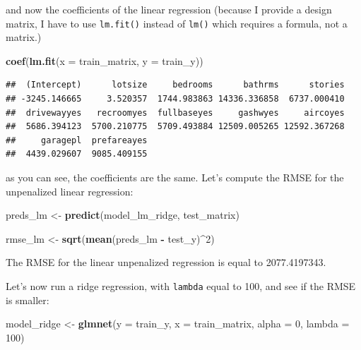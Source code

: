 \documentclass[]{gitbook}
\newenvironment{Shaded}{\begin{snugshade}}{\end{snugshade}}
\newcommand{\DataTypeTok}[1]{\textcolor[rgb]{0.13,0.29,0.53}{#1}}
\newcommand{\DecValTok}[1]{\textcolor[rgb]{0.00,0.00,0.81}{#1}}
\newcommand{\KeywordTok}[1]{\textcolor[rgb]{0.13,0.29,0.53}{\textbf{#1}}}
\newcommand{\NormalTok}[1]{#1}
\newcommand{\OperatorTok}[1]{\textcolor[rgb]{0.81,0.36,0.00}{\textbf{#1}}}
\newcommand{\StringTok}[1]{\textcolor[rgb]{0.31,0.60,0.02}{#1}}
\begin{document}
and now the coefficients of the linear regression (because I provide a design matrix, I have to use
\texttt{lm.fit()} instead of \texttt{lm()} which requires a formula, not a matrix.)

\begin{Shaded}
\begin{Highlighting}[]
\KeywordTok{coef}\NormalTok{(}\KeywordTok{lm.fit}\NormalTok{(}\DataTypeTok{x =}\NormalTok{ train_matrix, }\DataTypeTok{y =}\NormalTok{ train_y))}
\end{Highlighting}
\end{Shaded}

\begin{verbatim}
##  (Intercept)      lotsize     bedrooms      bathrms      stories 
## -3245.146665     3.520357  1744.983863 14336.336858  6737.000410 
##  drivewayyes   recroomyes  fullbaseyes     gashwyes     aircoyes 
##  5686.394123  5700.210775  5709.493884 12509.005265 12592.367268 
##     garagepl  prefareayes 
##  4439.029607  9085.409155
\end{verbatim}

as you can see, the coefficients are the same. Let's compute the RMSE for the unpenalized linear
regression:

\begin{Shaded}
\begin{Highlighting}[]
\NormalTok{preds_lm <-}\StringTok{ }\KeywordTok{predict}\NormalTok{(model_lm_ridge, test_matrix)}

\NormalTok{rmse_lm <-}\StringTok{ }\KeywordTok{sqrt}\NormalTok{(}\KeywordTok{mean}\NormalTok{(preds_lm }\OperatorTok{-}\StringTok{ }\NormalTok{test_y)}\OperatorTok{^}\DecValTok{2}\NormalTok{)}
\end{Highlighting}
\end{Shaded}

The RMSE for the linear unpenalized regression is equal to 2077.4197343.

Let's now run a ridge regression, with \texttt{lambda} equal to 100, and see if the RMSE is smaller:

\begin{Shaded}
\begin{Highlighting}[]
\NormalTok{model_ridge <-}\StringTok{ }\KeywordTok{glmnet}\NormalTok{(}\DataTypeTok{y =}\NormalTok{ train_y, }\DataTypeTok{x =}\NormalTok{ train_matrix, }\DataTypeTok{alpha =} \DecValTok{0}\NormalTok{, }\DataTypeTok{lambda =} \DecValTok{100}\NormalTok{)}
\end{Highlighting}
\end{Shaded}
\end{document}

